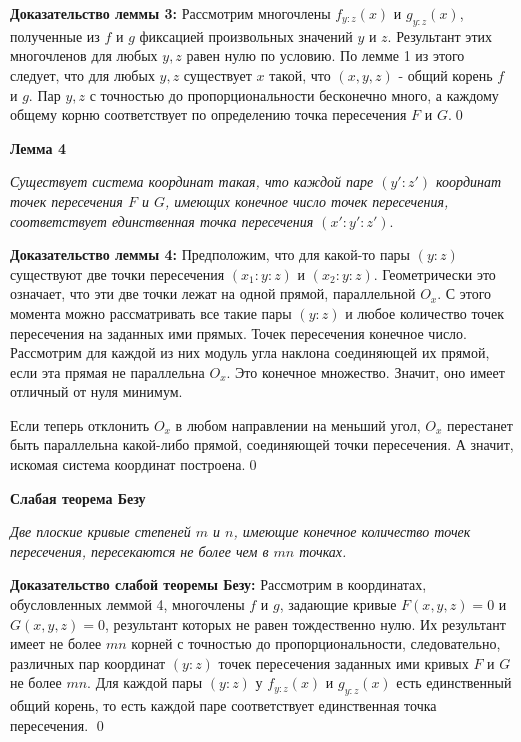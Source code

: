 \documentclass[a4paper, 12pt]{article}
\begin{document}
\textbf{Доказательство леммы 3:}\newline
Рассмотрим многочлены $f_{y:z}(x)$ и $g_{y:z}(x)$, полученные из $f$ и $g$ фиксацией произвольных значений $y$ и $z$. Результант этих многочленов для любых $y,z$ равен нулю по условию. По лемме 1 из этого следует, что для любых $y,z$ существует $x$ такой, что $(x,y,z)$ - общий корень $f$ и $g$. Пар $y,z$ с точностью до пропорциональности бесконечно много, а каждому общему корню соответствует по определению точка пересечения $F$ и $G$.\qed\newline

\smallskip
\textbf{Лемма 4}

\textit{Существует система координат такая, что каждой паре $(y':z')$ координат точек пересечения $F$ и $G$, имеющих конечное число точек пересечения, соответствует единственная точка пересечения $(x':y':z').$}\newline

\textbf{Доказательство леммы 4:}\newline
Предположим, что для какой-то пары $(y:z)$ существуют две точки пересечения $(x_1:y:z)$ и $(x_2:y:z)$. Геометрически это означает, что эти две точки лежат на одной прямой, параллельной $O_x$. С этого момента можно рассматривать все такие пары $(y:z)$ и любое количество точек пересечения на заданных ими прямых. Точек пересечения конечное число. Рассмотрим для каждой из них модуль угла наклона соединяющей их прямой, если эта прямая не параллельна $O_x$. Это конечное множество. Значит, оно имеет отличный от нуля минимум.\par Если теперь отклонить $O_x$ в любом направлении на меньший угол, $O_x$ перестанет быть параллельна какой-либо прямой, соединяющей точки пересечения. А значит, искомая система координат построена.\qed\newline

\textbf{Слабая теорема Безу}

\textit{Две плоские кривые степеней $m$ и $n$, имеющие конечное количество точек пересечения, пересекаются не более чем в $mn$ точках.}\newline

\textbf{Доказательство слабой теоремы Безу:}\newline
Рассмотрим в координатах, обусловленных леммой 4, многочлены $f$ и $g$, задающие кривые $F(x,y,z) = 0$ и $G(x,y,z) = 0$, результант которых не равен тождественно нулю. Их результант имеет не более $mn$ корней с точностью до пропорциональности, следовательно, различных пар координат $(y:z)$ точек пересечения заданных ими кривых $F$ и $G$ не более $mn$. Для каждой пары $(y:z)$ у $f_{y:z}(x)$ и $g_{y:z}(x)$ есть единственный общий корень, то есть каждой паре соответствует единственная точка пересечения. \qed\newline
\end{document}

